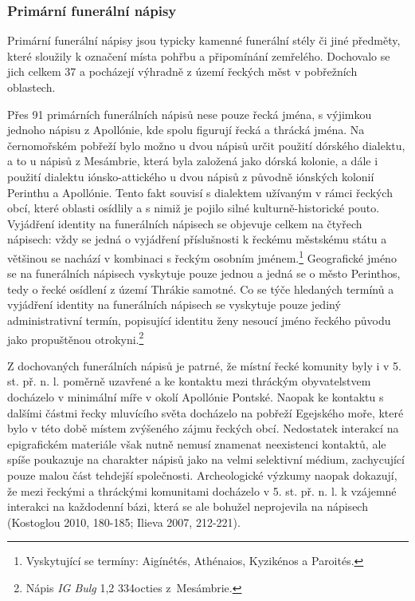 \subsubsection[primární-funerální-nápisy]{Primární funerální nápisy}

Primární funerální nápisy jsou typicky kamenné funerální stély či jiné předměty, které sloužily k označení místa pohřbu a připomínání zemřelého. Dochovalo se jich celkem 37 a pocházejí výhradně z území řeckých měst v pobřežních oblastech.

Přes 91  primárních funerálních nápisů nese pouze řecká jména, s výjimkou jednoho nápisu z Apollónie, kde spolu figurují řecká a thrácká jména. Na černomořském pobřeží bylo možno u dvou nápisů určit použití dórského dialektu, a to u nápisů z Mesámbrie, která byla založená jako dórská kolonie, a dále i použití dialektu iónsko-attického u dvou nápisů z původně iónských kolonií Perinthu a Apollónie. Tento fakt souvisí s dialektem užívaným v rámci řeckých obcí, které oblasti osídlily a s nimiž je pojilo silné kulturně-historické pouto. Vyjádření identity na funerálních nápisech se objevuje celkem na čtyřech nápisech: vždy se jedná o vyjádření příslušnosti k řeckému městskému státu a většinou se nachází v kombinaci s řeckým osobním jménem.\footnote{Vyskytující se termíny: Aigínétés, Athénaios, Kyzikénos a Paroités.} Geografické jméno se na funerálních nápisech vyskytuje pouze jednou a jedná se o město Perinthos, tedy o řecké osídlení z území Thrákie samotné. Co se týče hledaných termínů a vyjádření identity na funerálních nápisech se vyskytuje pouze jediný administrativní termín, popisující identitu ženy nesoucí jméno řeckého původu jako propuštěnou otrokyni.\footnote{Nápis {\em IG Bulg} 1,2 334octies z~Mesámbrie.}

Z dochovaných funerálních nápisů je patrné, že místní řecké komunity byly i v 5. st. př. n. l. poměrně uzavřené a ke kontaktu mezi thráckým obyvatelstvem docházelo v minimální míře v okolí Apollónie Pontské. Naopak ke kontaktu s dalšími částmi řecky mluvícího světa docházelo na pobřeží Egejského moře, které bylo v této době místem zvýšeného zájmu řeckých obcí. Nedostatek interakcí na epigrafickém materiále však nutně nemusí znamenat neexistenci kontaktů, ale spíše poukazuje na charakter nápisů jako na velmi selektivní médium, zachycující pouze malou část tehdejší společnosti. Archeologické výzkumy naopak dokazují, že mezi řeckými a thráckými komunitami docházelo v 5. st. př. n. l. k vzájemné interakci na každodenní bázi, která se ale bohužel neprojevila na nápisech (Kostoglou 2010, 180-185; Ilieva 2007, 212-221).

